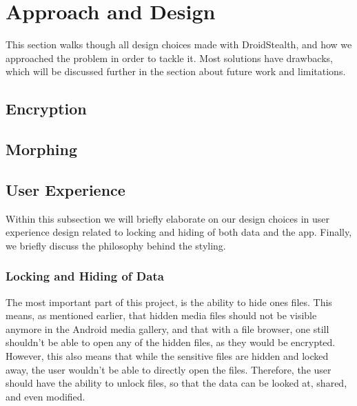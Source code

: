 \section{Approach and Design}
\label{sec:approach-and-design}
This section walks though all design choices made with DroidStealth,
and how we approached the problem in order to tackle it. Most 
solutions have drawbacks, which will be discussed further in the
section about future work and limitations. %


\subsection{Encryption}
\label{sec:approach-and-design:encryption}

\subsection{Morphing}
\label{sec:approach-and-design:morphing}

\subsection{User Experience}
\label{sec:approach-and-design:user-experience}

Within this subsection we will briefly elaborate on our design
choices in user experience design related to locking and hiding
of both data and the app. Finally, we briefly discuss the 
philosophy behind the styling. 

\subsubsection{Locking and Hiding of Data}

The most important part of this project, is the ability to hide
ones files. This means, as mentioned earlier, that hidden media
files should not be visible anymore in the Android media
gallery, and that with a file browser, one still shouldn't be
able to open any of the hidden files, as they would be
encrypted. However, this also means that while the sensitive
files are hidden and locked away, the user wouldn't be able to
directly open the files. Therefore, the user should have the
ability to unlock files, so that the data can be looked at,
shared, and even modified.

